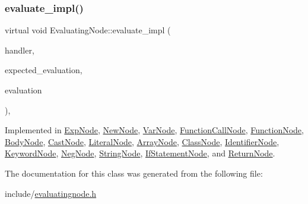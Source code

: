 \subsubsection{\texorpdfstring{evaluate\+\_\+impl()}{evaluate\_impl()}}
{\footnotesize\ttfamily virtual void Evaluating\+Node\+::evaluate\+\_\+impl (\begin{DoxyParamCaption}\item[{\hyperlink{classSystemHandler}{System\+Handler} $\ast$}]{handler,  }\item[{\hyperlink{statics_8h_a6664c451ca7787483a7981cc1de68dbb}{E\+V\+A\+L\+U\+A\+T\+I\+O\+N\+\_\+\+T\+Y\+PE}}]{expected\+\_\+evaluation,  }\item[{struct \hyperlink{structEvaluation}{Evaluation} $\ast$}]{evaluation }\end{DoxyParamCaption})\hspace{0.3cm}{\ttfamily [protected]}, {}}



Implemented in \hyperlink{classExpNode_a58c05ac75051f109512ce8fa5ceb68c7}{Exp\+Node}, \hyperlink{classNewNode_a53fe843af3bbb2add900646ef3891f8e}{New\+Node}, \hyperlink{classVarNode_affe926e80803de0a83ce88f9a0d97db3}{Var\+Node}, \hyperlink{classFunctionCallNode_a65f15b75804343caf5c4ce291460b1dc}{Function\+Call\+Node}, \hyperlink{classFunctionNode_a697f1fdc368f5ad09284b32b4466f353}{Function\+Node}, \hyperlink{classBodyNode_ab08c6586b725065afca095786b842991}{Body\+Node}, \hyperlink{classCastNode_ae0c32d5d076c2572fa7afc9cb1a76a79}{Cast\+Node}, \hyperlink{classLiteralNode_ac468128f093b3955ddd7c85eaa959ec2}{Literal\+Node}, \hyperlink{classArrayNode_aeefbfe735ed37a81785a492dbc66eddc}{Array\+Node}, \hyperlink{classClassNode_ab969f53cd181de184a8f82273dbd77ab}{Class\+Node}, \hyperlink{classIdentifierNode_a4960a1e68623066e413f8c2d68cee7e5}{Identifier\+Node}, \hyperlink{classKeywordNode_a699f7171c8415901b1a501f72933cfdf}{Keyword\+Node}, \hyperlink{classNegNode_a504b9103413ac571d7a332cd4dd0b9c5}{Neg\+Node}, \hyperlink{classStringNode_a1399a24e093f4ecd00957268923c5d23}{String\+Node}, \hyperlink{classIfStatementNode_a725287a819ddcdc914cf774da80272e4}{If\+Statement\+Node}, and \hyperlink{classReturnNode_ac07545808632b52ec192cce2dd80b051}{Return\+Node}.



The documentation for this class was generated from the following file\+:\begin{DoxyCompactItemize}
\item 
include/\hyperlink{evaluatingnode_8h}{evaluatingnode.\+h}\end{DoxyCompactItemize}
